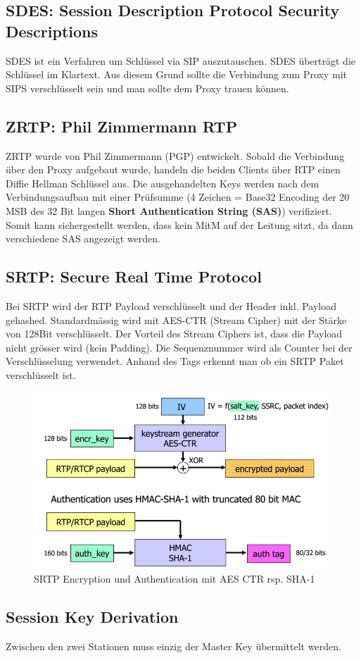 \subsection{SDES: Session Description Protocol Security Descriptions}
SDES ist ein Verfahren um Schlüssel via SIP auszutauschen. SDES überträgt die Schlüssel im Klartext. Aus diesem Grund sollte die Verbindung zum Proxy mit SIPS verschlüsselt sein und man sollte dem Proxy trauen können.

\clearpage

\subsection{ZRTP: Phil Zimmermann RTP}
ZRTP wurde von Phil Zimmermann (PGP) entwickelt. Sobald die Verbindung über den Proxy aufgebaut wurde, handeln die beiden Clients über RTP einen Diffie Hellman Schlüssel aus. Die ausgehandelten Keys werden nach dem Verbindungsaufbau mit einer Prüfsumme (4 Zeichen = Base32 Encoding der 20 MSB des 32 Bit langen \textbf{Short Authentication String (SAS)}) verifiziert. Somit kann sichergestellt werden, dass kein MitM auf der Leitung sitzt, da dann verschiedene SAS angezeigt werden.

\subsection{SRTP: Secure Real Time Protocol}
Bei SRTP wird der RTP Payload verschlüsselt und der Header inkl. Payload gehashed. Standardmässig wird mit AES-CTR (Stream Cipher) mit der Stärke von 128Bit verschlüsselt. Der Vorteil des Stream Ciphers ist, dass die Payload nicht grösser wird (kein Padding). Die Sequenznummer wird als Counter bei der Verschlüsselung verwendet. Anhand des Tags erkennt man ob ein SRTP Paket verschlüsselt ist.
\begin{figure}[h]
\centering
\includegraphics[width=0.5\linewidth]{images/srtp}
\caption{SRTP Encryption und Authentication mit AES CTR rsp. SHA-1}
\label{fig:srtp}
\end{figure}

\subsection{Session Key Derivation}
Zwischen den zwei Stationen muss einzig der Master Key übermittelt werden. 


